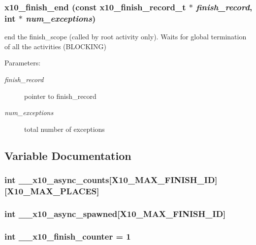 \subsubsection{ x10\_\-finish\_\-end (const {\bf x10\_\-finish\_\-record\_\-t} $\ast$ {\em finish\_\-record}, int $\ast$ {\em num\_\-exceptions})}\label{finish_8cc_a16}


end the finish\_\-scope (called by root activity only). Waits for global termination of all the activities (BLOCKING) 

\begin{Desc}
\item[Parameters:]
\begin{description}
\item[{\em finish\_\-record}]pointer to finish\_\-record \item[{\em num\_\-exceptions}]total number of exceptions \end{description}
\end{Desc}


\subsection{Variable Documentation}
\subsubsection{\setlength{\rightskip}{0pt plus 5cm}int {\bf \_\-\_\-x10\_\-async\_\-counts}[X10\_\-MAX\_\-FINISH\_\-ID][X10\_\-MAX\_\-PLACES]}\label{finish_8cc_a5}


\subsubsection{\setlength{\rightskip}{0pt plus 5cm}int {\bf \_\-\_\-x10\_\-async\_\-spawned}[X10\_\-MAX\_\-FINISH\_\-ID]}\label{finish_8cc_a6}


\subsubsection{\setlength{\rightskip}{0pt plus 5cm}int {\bf \_\-\_\-x10\_\-finish\_\-counter} = 1\hspace{0.3cm}{\tt  [static]}}\label{finish_8cc_a4}


